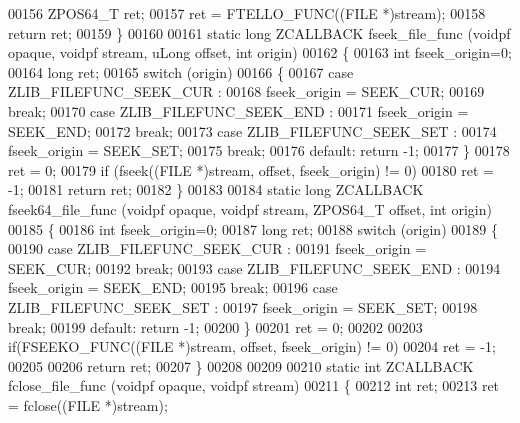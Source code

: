 \begin{DoxyCode}
00156     ZPOS64\_T ret;
00157     ret = FTELLO\_FUNC((FILE *)stream);
00158     \textcolor{keywordflow}{return} ret;
00159 \}
00160 
00161 \textcolor{keyword}{static} \textcolor{keywordtype}{long} ZCALLBACK fseek\_file\_func (voidpf  opaque, voidpf stream, uLong offset, \textcolor{keywordtype}{int} origin)
00162 \{
00163     \textcolor{keywordtype}{int} fseek\_origin=0;
00164     \textcolor{keywordtype}{long} ret;
00165     \textcolor{keywordflow}{switch} (origin)
00166     \{
00167     \textcolor{keywordflow}{case} ZLIB\_FILEFUNC\_SEEK\_CUR :
00168         fseek\_origin = SEEK\_CUR;
00169         \textcolor{keywordflow}{break};
00170     \textcolor{keywordflow}{case} ZLIB\_FILEFUNC\_SEEK\_END :
00171         fseek\_origin = SEEK\_END;
00172         \textcolor{keywordflow}{break};
00173     \textcolor{keywordflow}{case} ZLIB\_FILEFUNC\_SEEK\_SET :
00174         fseek\_origin = SEEK\_SET;
00175         \textcolor{keywordflow}{break};
00176     \textcolor{keywordflow}{default}: \textcolor{keywordflow}{return} -1;
00177     \}
00178     ret = 0;
00179     \textcolor{keywordflow}{if} (fseek((FILE *)stream, offset, fseek\_origin) != 0)
00180         ret = -1;
00181     \textcolor{keywordflow}{return} ret;
00182 \}
00183 
00184 \textcolor{keyword}{static} \textcolor{keywordtype}{long} ZCALLBACK fseek64\_file\_func (voidpf  opaque, voidpf stream, ZPOS64\_T offset, \textcolor{keywordtype}{int} origin)
00185 \{
00186     \textcolor{keywordtype}{int} fseek\_origin=0;
00187     \textcolor{keywordtype}{long} ret;
00188     \textcolor{keywordflow}{switch} (origin)
00189     \{
00190     \textcolor{keywordflow}{case} ZLIB\_FILEFUNC\_SEEK\_CUR :
00191         fseek\_origin = SEEK\_CUR;
00192         \textcolor{keywordflow}{break};
00193     \textcolor{keywordflow}{case} ZLIB\_FILEFUNC\_SEEK\_END :
00194         fseek\_origin = SEEK\_END;
00195         \textcolor{keywordflow}{break};
00196     \textcolor{keywordflow}{case} ZLIB\_FILEFUNC\_SEEK\_SET :
00197         fseek\_origin = SEEK\_SET;
00198         \textcolor{keywordflow}{break};
00199     \textcolor{keywordflow}{default}: \textcolor{keywordflow}{return} -1;
00200     \}
00201     ret = 0;
00202 
00203     \textcolor{keywordflow}{if}(FSEEKO\_FUNC((FILE *)stream, offset, fseek\_origin) != 0)
00204                         ret = -1;
00205 
00206     \textcolor{keywordflow}{return} ret;
00207 \}
00208 
00209 
00210 \textcolor{keyword}{static} \textcolor{keywordtype}{int} ZCALLBACK fclose\_file\_func (voidpf opaque, voidpf stream)
00211 \{
00212     \textcolor{keywordtype}{int} ret;
00213     ret = fclose((FILE *)stream);

\end{DoxyCode}
